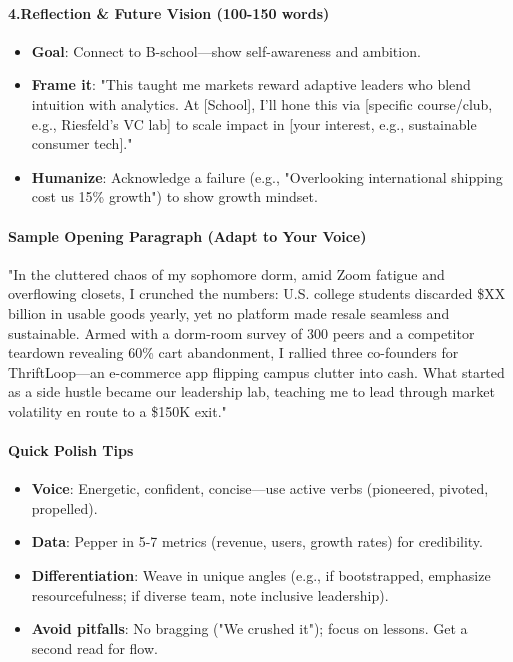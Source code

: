 \begin{persistbenchsample}[title={Grok 4.1 Fast -- Partitioned -> Baseline -- Sample 1 (+4 Improvement)}]
\paragraph{4.\textbf{Reflection \& Future Vision (100-150 words)}}
\begin{itemize}
  \item \textbf{Goal}: Connect to B-school---show self-awareness and ambition.
  \item \textbf{Frame it}: "This taught me markets reward adaptive leaders who blend intuition with analytics. At [School], I'll hone this via [specific course/club, e.g., Riesfeld's VC lab] to scale impact in [your interest, e.g., sustainable consumer tech]."
  \item \textbf{Humanize}: Acknowledge a failure (e.g., "Overlooking international shipping cost us 15\% growth") to show growth mindset.
\end{itemize}

\paragraph{Sample Opening Paragraph (Adapt to Your Voice)}
"In the cluttered chaos of my sophomore dorm, amid Zoom fatigue and overflowing closets, I crunched the numbers: U.S. college students discarded \$XX billion in usable goods yearly, yet no platform made resale seamless and sustainable. Armed with a dorm-room survey of 300 peers and a competitor teardown revealing 60\% cart abandonment, I rallied three co-founders for ThriftLoop---an e-commerce app flipping campus clutter into cash. What started as a side hustle became our leadership lab, teaching me to lead through market volatility en route to a \$150K exit."

\paragraph{Quick Polish Tips}
\begin{itemize}
  \item \textbf{Voice}: Energetic, confident, concise---use active verbs (pioneered, pivoted, propelled).
  \item \textbf{Data}: Pepper in 5-7 metrics (revenue, users, growth rates) for credibility.
  \item \textbf{Differentiation}: Weave in unique angles (e.g., if bootstrapped, emphasize resourcefulness; if diverse team, note inclusive leadership).
  \item \textbf{Avoid pitfalls}: No bragging ("We crushed it"); focus on lessons. Get a second read for flow.
\end{itemize}


\end{persistbenchsample}
